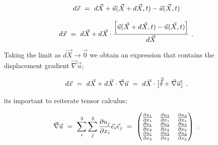\documentclass{article}
\begin{document}
\begin{equation} \label{eb-eq-1-69}
d \vec{x} \hspace{0.125cm} = \hspace{0.125cm} d \vec{X} +  \vec{u}( \vec{X} + d \vec{X} , t ) -  \vec{u}( \vec{X} , t ) 
\end{equation} 

\begin{equation} \label{eb-eq-1-70}
d \vec{x} \hspace{0.125cm} = \hspace{0.125cm} d \vec{X} + d \vec{X} \cdot \frac{\Big[ \vec{u}( \vec{X} + d \vec{X} , t ) -  \vec{u}( \vec{X} , t ) \Big]}{d \vec{X}} \hspace{0.125cm} .
\end{equation} 

Taking the limit as \begin{math} d \vec{X} \rightarrow \vec{0} \end{math} we obtain an expression that contains the displacement gradient \begin{math} \vec{\nabla} \vec{u} \end{math};

\begin{equation} \label{eb-eq-1-71}
d \vec{x} \hspace{0.125cm} = \hspace{0.125cm} d \vec{X} + d \vec{X} \cdot \vec{\nabla} \vec{u}  \hspace{0.125cm} = \hspace{0.125cm} d \vec{X} \cdot \big[ \vec{\vec{\delta}} + \vec{\nabla} \vec{u} \big] \hspace{0.125cm} .
\end{equation} 

its important to reiterate tensor calculus;

\begin{equation} \label{eb-eq-1-72}
\vec{\nabla} \vec{u} \hspace{0.125cm} = \hspace{0.125cm} \sum_{i}^{3} \sum_{j}^{3} \frac{\partial{u_j}}{\partial{x_i}} \vec{e}_i \vec{e}_j  \hspace{0.125cm} =  \hspace{0.125cm}  \begin{pmatrix} \frac{\partial{u_1}}{\partial{x_1}} & \frac{\partial{u_2}}{\partial{x_1}} & \frac{\partial{u_3}}{\partial{x_1}} \\ \frac{\partial{u_1}}{\partial{x_2}} & \frac{\partial{u_2}}{\partial{x_2}} & \frac{\partial{u_3}}{\partial{x_2}} \\ \frac{\partial{u_1}}{\partial{x_3}} & \frac{\partial{u_2}}{\partial{x_3}} & \frac{\partial{u_3}}{\partial{x_3}} \end{pmatrix}  \hspace{0.125cm} .
\end{equation} 
\end{document}

